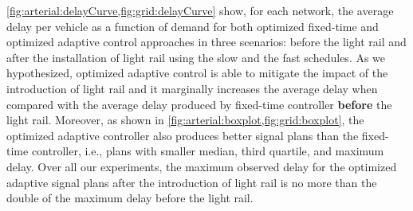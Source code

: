 \cref{fig:arterial:delayCurve,fig:grid:delayCurve} show, for each network, the
average delay per vehicle as a function of demand for both optimized fixed-time
and optimized adaptive control approaches in three scenarios: before the light
rail and after the installation of light rail using the slow and the fast
schedules.
%
As we hypothesized, optimized adaptive control is able to mitigate the impact of
the introduction of light rail and it marginally increases the average delay
when compared with the average delay produced by fixed-time controller
\textbf{before} the light rail.
%
Moreover, as shown in \cref{fig:arterial:boxplot,fig:grid:boxplot}, the
optimized adaptive controller also produces better signal plans than the
fixed-time controller, i.e., plans with smaller median, third quartile, and
maximum delay.
%
Over all our experiments, the maximum observed delay for the optimized adaptive
signal plans after the introduction of light rail is no more than
%
%
the double of the maximum delay before the light rail.
%


